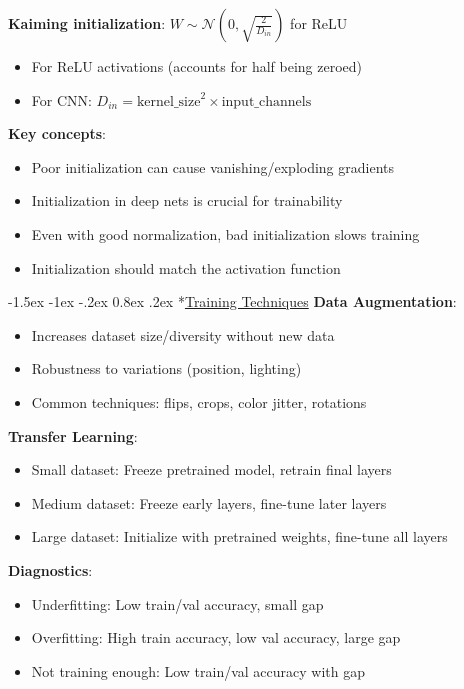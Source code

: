 \documentclass{article}
\makeatletter
\renewcommand\section{\@startsection{section}{1}{\z@}%
                                  {-1.5ex \@plus -1ex \@minus -.2ex}%
                                  {0.8ex \@plus.2ex}%
                                  {\normalfont\small\bfseries}}
\makeatother
\begin{document}
\begin{multicols}{3}
\textbf{Kaiming initialization}: $W \sim \mathcal{N}(0, \sqrt{\frac{2}{D_{in}}})$ for ReLU
\begin{itemize}
\item For ReLU activations (accounts for half being zeroed)
\item For CNN: $D_{in} = \text{kernel\_size}^2 \times \text{input\_channels}$
\end{itemize}

\textbf{Key concepts}:
\begin{itemize}
\item Poor initialization can cause vanishing/exploding gradients
\item Initialization in deep nets is crucial for trainability
\item Even with good normalization, bad initialization slows training
\item Initialization should match the activation function
\end{itemize}

\section*{\underline{Training Techniques}}
\textbf{Data Augmentation}:
\begin{itemize}
\item Increases dataset size/diversity without new data
\item Robustness to variations (position, lighting)
\item Common techniques: flips, crops, color jitter, rotations
\end{itemize}

\textbf{Transfer Learning}:
\begin{itemize}
\item Small dataset: Freeze pretrained model, retrain final layers
\item Medium dataset: Freeze early layers, fine-tune later layers
\item Large dataset: Initialize with pretrained weights, fine-tune all layers
\end{itemize}

\textbf{Diagnostics}:
\begin{itemize}
\item Underfitting: Low train/val accuracy, small gap
\item Overfitting: High train accuracy, low val accuracy, large gap
\item Not training enough: Low train/val accuracy with gap
\end{itemize}


\end{multicols}
\end{document}

